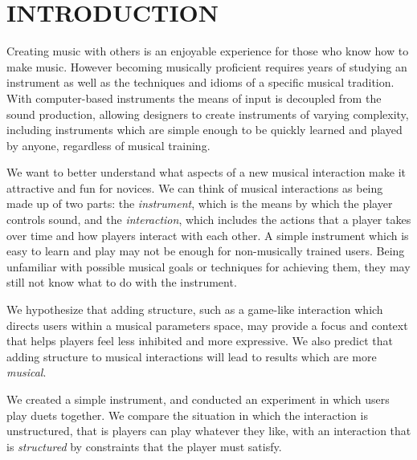 \documentclass{article}
\begin{document}







\section{INTRODUCTION}
Creating music with others is an enjoyable experience for those who know how to make music. However becoming musically proficient requires years of studying an instrument as well as the techniques and idioms of a specific musical tradition. With computer-based instruments the means of input is decoupled from the sound production, allowing designers to create instruments of varying complexity, including instruments which are simple enough to be quickly learned and played by anyone, regardless of musical training.

We want to better understand what aspects of a new musical interaction make it attractive and fun for novices.  We can think of musical interactions as being made up of two parts:  the \textit{instrument}, which is the means by which the player controls sound, and the \textit{interaction}, which includes the actions that a player takes over time and how players interact with each other.  A simple instrument which is easy to learn and play may not be enough for non-musically trained users. Being unfamiliar with possible musical goals or techniques for achieving them, they may still not know what to do with the instrument.

We hypothesize that adding structure, such as a game-like interaction which directs users within a musical parameters space, may provide a focus and context that helps players feel less inhibited and more expressive.   We also predict that adding structure to musical interactions will lead to results which are more \textit{musical}.

We created a simple instrument, and conducted an experiment in which users play duets together.  We compare the situation in which the interaction is unstructured, that is players can play whatever they like, with an interaction that is \textit{structured} by constraints that the player must satisfy.
\end{document}
